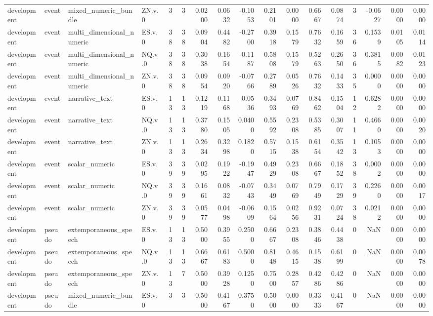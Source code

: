 \begin{tabular}{llllrrrrrrrrrrrrr}
development & event & mixed_numeric_bundle & ZN.v.0 & 3 & 3 & 0.0200 & 0.0632 & -0.1053 & 0.2101 & 0.0000 & 0.6667 & 0.0874 & 3 & -0.0627 & 0.0000 & 0.0000 \\
development & event & multi_dimensional_numeric & ES.v.0 & 38 & 38 & 0.0904 & 0.4482 & -0.2700 & 0.3918 & 0.1579 & 0.7632 & 0.1659 & 36 & 0.1539 & 0.0105 & 0.0114 \\
development & event & multi_dimensional_numeric & NQ.v.0 & 38 & 38 & 0.3038 & 0.1654 & -0.1187 & 0.5808 & 0.1579 & 0.5263 & 0.2650 & 36 & 0.3815 & 0.0082 & 0.0123 \\
development & event & multi_dimensional_numeric & ZN.v.0 & 38 & 38 & 0.0954 & 0.0920 & -0.0766 & 0.2789 & 0.0526 & 0.7632 & 0.1433 & 35 & 0.0000 & 0.0000 & 0.0000 \\
development & event & narrative_text & ES.v.0 & 13 & 13 & 0.1219 & 0.1168 & -0.0536 & 0.3493 & 0.0769 & 0.8462 & 0.1504 & 12 & 0.6282 & 0.0000 & 0.0000 \\
development & event & narrative_text & NQ.v.0 & 13 & 13 & 0.3780 & 0.1505 & 0.0400 & 0.5592 & 0.2308 & 0.5385 & 0.3007 & 11 & 0.4660 & 0.0000 & 0.0020 \\
development & event & narrative_text & ZN.v.0 & 13 & 13 & 0.2634 & 0.3298 & 0.1820 & 0.5715 & 0.1538 & 0.6154 & 0.3542 & 13 & 0.1053 & 0.0000 & 0.0000 \\
development & event & scalar_numeric & ES.v.0 & 39 & 39 & 0.0295 & 0.1922 & -0.1947 & 0.4929 & 0.2308 & 0.6667 & 0.1852 & 38 & 0.0002 & 0.0000 & 0.0000 \\
development & event & scalar_numeric & NQ.v.0 & 39 & 39 & 0.1661 & 0.0832 & -0.0743 & 0.3449 & 0.0769 & 0.7949 & 0.1729 & 39 & 0.2260 & 0.0000 & 0.0017 \\
development & event & scalar_numeric & ZN.v.0 & 39 & 39 & 0.0577 & 0.0498 & -0.0609 & 0.1564 & 0.0256 & 0.9231 & 0.0724 & 38 & 0.0212 & 0.0000 & 0.0000 \\
development & pseudo & extemporaneous_speech & ES.v.0 & 13 & 13 & 0.5000 & 0.3955 & 0.2500 & 0.6667 & 0.2308 & 0.3846 & 0.4438 & 0 & NaN & 0.0000 & 0.0000 \\
development & pseudo & extemporaneous_speech & NQ.v.0 & 13 & 13 & 0.6667 & 0.6183 & 0.5000 & 0.8148 & 0.4615 & 0.1538 & 0.6199 & 0 & NaN & 0.0000 & 0.0078 \\
development & pseudo & extemporaneous_speech & ZN.v.0 & 13 & 7 & 0.5000 & 0.3928 & 0.1250 & 0.7500 & 0.2857 & 0.4286 & 0.4286 & 0 & NaN & 0.0000 & 0.0000 \\
development & pseudo & mixed_numeric_bundle & ES.v.0 & 3 & 3 & 0.5000 & 0.4167 & 0.3750 & 0.5000 & 0.0000 & 0.3333 & 0.4167 & 0 & NaN & 0.0000 & 0.0000 \\

\end{tabular}
